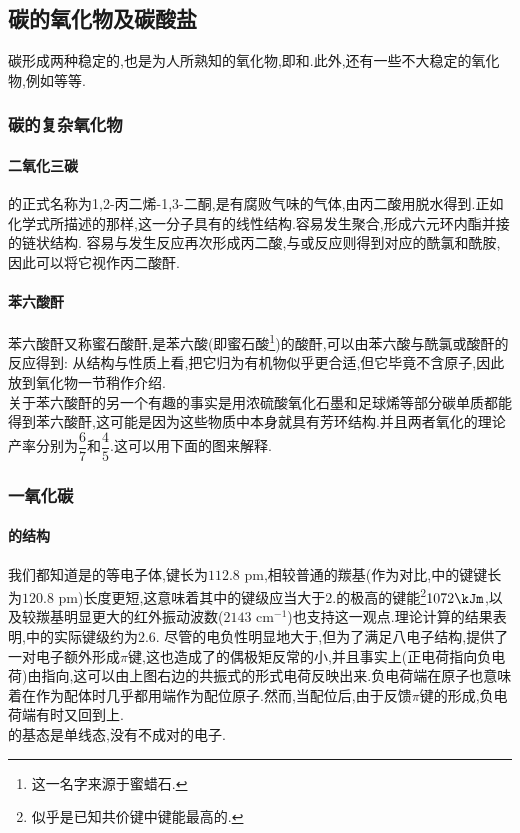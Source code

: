 \documentclass{ctexart}
\begin{document}
\subsection{碳的氧化物及碳酸盐}
碳形成两种稳定的,也是为人所熟知的氧化物,即和.此外,还有一些不大稳定的氧化物,例如等等.
\subsubsection{碳的复杂氧化物}
\paragraph{二氧化三碳}
的正式名称为1,2-丙二烯-1,3-二酮,是有腐败气味的气体,由丙二酸用脱水得到.正如化学式所描述的那样,这一分子具有的线性结构.容易发生聚合,形成六元环内酯并接的链状结构.
容易与发生反应再次形成丙二酸,与或反应则得到对应的酰氯和酰胺,因此可以将它视作丙二酸酐.
\paragraph{苯六酸酐}
苯六酸酐又称蜜石酸酐,是苯六酸(即蜜石酸\footnote{这一名字来源于蜜蜡石.})的酸酐,可以由苯六酸与酰氯或酸酐的反应得到:
从结构与性质上看,把它归为有机物似乎更合适,但它毕竟不含原子,因此放到氧化物一节稍作介绍.\\
关于苯六酸酐的另一个有趣的事实是用浓硫酸氧化石墨和足球烯等部分碳单质都能得到苯六酸酐,这可能是因为这些物质中本身就具有芳环结构.并且两者氧化的理论产率分别为$\dfrac67$和$\dfrac45$.这可以用下面的图来解释.
\subsubsection{一氧化碳}
\paragraph{的结构}
我们都知道是的等电子体,键长为$112.8\text{ pm}$,相较普通的羰基(作为对比,中的键键长为$120.8\text{ pm}$)长度更短,这意味着其中的键级应当大于$2$.的极高的键能\footnote{似乎是已知共价键中键能最高的.}$1072\kJm$,以及较羰基明显更大的红外振动波数($2143\text{ cm}^{-1}$)也支持这一观点.理论计算的结果表明,中的实际键级约为$2.6$.
尽管的电负性明显地大于,但为了满足八电子结构,提供了一对电子额外形成$\pi$键,这也造成了的偶极矩反常的小,并且事实上(正电荷指向负电荷)由指向,这可以由上图右边的共振式的形式电荷反映出来.负电荷端在原子也意味着在作为配体时几乎都用端作为配位原子.然而,当配位后,由于反馈$\pi$键的形成,负电荷端有时又回到上.\\
\indent {}的基态是单线态,没有不成对的电子.
\end{document}
